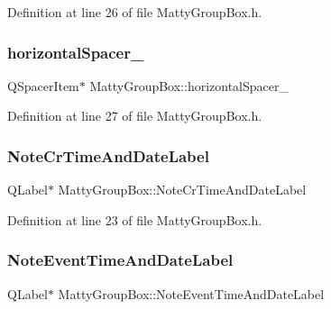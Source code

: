 Definition at line 26 of file Matty\+Group\+Box.\+h.

\hypertarget{classMattyGroupBox_a633d989baf5de2db6d0c01702ba6b410}{}\label{classMattyGroupBox_a633d989baf5de2db6d0c01702ba6b410} 
\subsubsection{\texorpdfstring{horizontal\+Spacer\+\_}{horizontalSpacer\_2}}
{\footnotesize\ttfamily Q\+Spacer\+Item$\ast$ Matty\+Group\+Box\+::horizontal\+Spacer\+\_\hspace{0.3cm}{\ttfamily [private]}}



Definition at line 27 of file Matty\+Group\+Box.\+h.

\hypertarget{classMattyGroupBox_a1a71503d5ede703b934e4f02d932a038}{}\label{classMattyGroupBox_a1a71503d5ede703b934e4f02d932a038} 
\subsubsection{\texorpdfstring{Note\+Cr\+Time\+And\+Date\+Label}{NoteCrTimeAndDateLabel}}
{\footnotesize\ttfamily Q\+Label$\ast$ Matty\+Group\+Box\+::\+Note\+Cr\+Time\+And\+Date\+Label\hspace{0.3cm}{\ttfamily [private]}}



Definition at line 23 of file Matty\+Group\+Box.\+h.

\hypertarget{classMattyGroupBox_a97b192413385021b01b34db7493f8b49}{}\label{classMattyGroupBox_a97b192413385021b01b34db7493f8b49} 
\subsubsection{\texorpdfstring{Note\+Event\+Time\+And\+Date\+Label}{NoteEventTimeAndDateLabel}}
{\footnotesize\ttfamily Q\+Label$\ast$ Matty\+Group\+Box\+::\+Note\+Event\+Time\+And\+Date\+Label\hspace{0.3cm}{\ttfamily [private]}}



